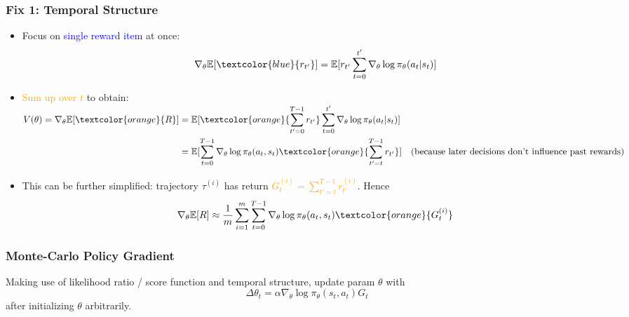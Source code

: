 \documentclass{article}
\begin{document}
\subsubsection{Fix 1: Temporal Structure}
\begin{itemize}
\item Focus on \textcolor{blue}{single reward item} at once:
    \begin{equation*}
        \nabla_{\theta} \mathbb{E}[\textcolor{blue}{r_{t'}}] = \mathbb{E}[r_{t'} \sum_{t = 0}^{t'} \nabla_{\theta} \log \pi_{\theta} (a_t | s_t)]
    \end{equation*}
\item \textcolor{orange}{Sum up over $t$} to obtain:
    $\begin{aligned}
        V(\theta) = \nabla_{\theta} \mathbb{E}[\textcolor{orange}{R}] & 
        = \mathbb{E} [ \textcolor{orange}{\sum_{t' = 0}^{T-1} r_{t'}} \sum_{t = 0}^{t'} \nabla_{\theta} \log \pi_{\theta} (a_t | s_t)] \\
        & = \mathbb{E} [ \sum_{t = 0}^{T-1} \nabla_{\theta} \log \pi_{\theta} (a_t , s_t) \textcolor{orange}{\sum_{t' = t}^{T-1} r_{t'}}] \quad \text{(because later decisions don't influence past rewards)}\\
    \end{aligned}$
\item This can be further simplified: trajectory $\tau^{(i)}$ has return \textcolor{orange}{$G_t^{(i)} = \sum_{t' = t}^{T-1} r_{t'}^{(i)}$}. Hence
    \begin{equation*}
        \nabla_{\theta} \mathbb{E}[R] \approx \frac{1}{m} \sum_{i = 1}^{m} \sum_{t = 0}^{T-1} \nabla_{\theta} \log \pi_{\theta} (a_t, s_t) \textcolor{orange}{G_t^{(i)}}
    \end{equation*}
\end{itemize}

\begin{thmbox}
    \subsubsection*{Monte-Carlo Policy Gradient}
    Making use of likelihood ratio / score function and temporal structure, update param $\theta$ with
    \begin{equation*}
        \Delta \theta_{t} = \alpha \nabla_{\theta} \log \pi_{\theta} (s_t, a_t) G_{t}
    \end{equation*}
    after initializing $\theta$ arbitrarily.
\end{thmbox}
\end{document}
